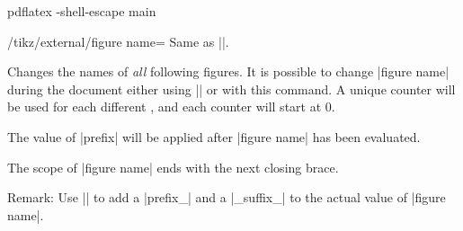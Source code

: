 {\begin{command}{}
\begin{codeexample}
\end{codeexample}
\begin{codeexample}[code only, tikz syntax=false]
pdflatex -shell-escape main
\end{codeexample}
\end{command}

\begin{key}{/tikz/external/figure name=}
    Same as ||.
\end{key}

\begin{command}{}
    Changes the names of \emph{all} following figures. It is possible to change
    |figure name| during the document either using
    || or with this command. A
    unique counter will be used for each different , and each
    counter will start at $0$.

    The value of |prefix| will be applied after |figure name| has been
    evaluated.
    The scope of |figure name| ends with the next closing brace.

    Remark: Use || to
    add a |prefix_| and a |_suffix_| to the actual value of |figure name|.
\end{command}

}
